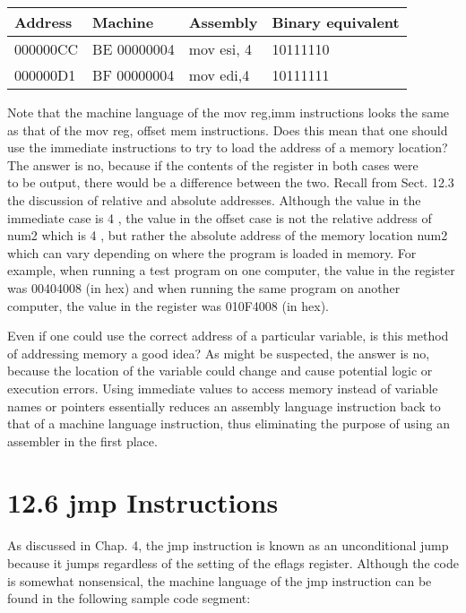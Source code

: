 \documentclass[10pt]{article}
\begin{document}
\begin{center}
\begin{tabular}{|l|l|l|l|}
\hline
Address & Machine & Assembly & Binary equivalent \\
\hline
000000CC & BE 00000004 & mov esi, 4 & 10111110 \\
\hline
000000D1 & BF 00000004 & mov edi,4 & 10111111 \\
\hline
\end{tabular}
\end{center}

Note that the machine language of the mov reg,imm instructions looks the same as that of the mov reg, offset mem instructions. Does this mean that one should use the immediate instructions to try to load the address of a memory location? The answer is no, because if the contents of the register in both cases were\\
to be output, there would be a difference between the two. Recall from Sect. 12.3 the discussion of relative and absolute addresses. Although the value in the immediate case is 4 , the value in the offset case is not the relative address of num2 which is 4 , but rather the absolute address of the memory location num2 which can vary depending on where the program is loaded in memory. For example, when running a test program on one computer, the value in the register was 00404008 (in hex) and when running the same program on another computer, the value in the register was 010F4008 (in hex).

Even if one could use the correct address of a particular variable, is this method of addressing memory a good idea? As might be suspected, the answer is no, because the location of the variable could change and cause potential logic or execution errors. Using immediate values to access memory instead of variable names or pointers essentially reduces an assembly language instruction back to that of a machine language instruction, thus eliminating the purpose of using an assembler in the first place.

\section*{12.6 jmp Instructions}
As discussed in Chap. 4, the jmp instruction is known as an unconditional jump because it jumps regardless of the setting of the eflags register. Although the code is somewhat nonsensical, the machine language of the jmp instruction can be found in the following sample code segment:
\end{document}
